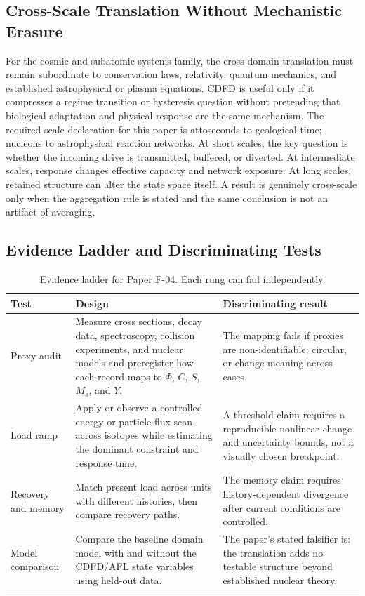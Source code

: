\documentclass[11pt,a4paper]{article}
\begin{document}
\subsection{Cross-Scale Translation Without Mechanistic Erasure}

For the cosmic and subatomic systems family, the cross-domain translation must remain subordinate to conservation laws, relativity, quantum mechanics, and established astrophysical or plasma equations. CDFD is useful only if it compresses a regime transition or hysteresis question without pretending that biological adaptation and physical response are the same mechanism. \cite{Turing1952,Shannon1948,BakTangWiesenfeld1987}
The required scale declaration for this paper is attoseconds to geological time; nucleons to astrophysical reaction networks. At short
scales, the key question is whether the incoming drive is transmitted,
buffered, or diverted. At intermediate scales, response changes effective
capacity and network exposure. At long scales, retained structure can alter the
state space itself. A result is genuinely cross-scale only when the aggregation
rule is stated and the same conclusion is not an artifact of averaging.

\subsection{Evidence Ladder and Discriminating Tests}

\begin{table}[htbp]
\centering
\small
\caption{Evidence ladder for Paper F-04. Each rung can fail independently.}
\begin{tabularx}{\textwidth}{|p{}|X|X|}
\hline
\textbf{Test} & \textbf{Design} & \textbf{Discriminating result} \\
\hline
Proxy audit & Measure cross sections, decay data, spectroscopy, collision experiments, and nuclear models and preregister how each record maps to $\Phi$, $C$, $S$, $M_s$, and $Y$. & The mapping fails if proxies are non-identifiable, circular, or change meaning across cases. \\
\hline
Load ramp & Apply or observe a controlled energy or particle-flux scan across isotopes while estimating the dominant constraint and response time. & A threshold claim requires a reproducible nonlinear change and uncertainty bounds, not a visually chosen breakpoint. \\
\hline
Recovery and memory & Match present load across units with different histories, then compare recovery paths. & The memory claim requires history-dependent divergence after current conditions are controlled. \\
\hline
Model comparison & Compare the baseline domain model with and without the CDFD/AFL state variables using held-out data. & The paper's stated falsifier is: the translation adds no testable structure beyond established nuclear theory. \\
\hline
\end{tabularx}
\end{table}
\end{document}

